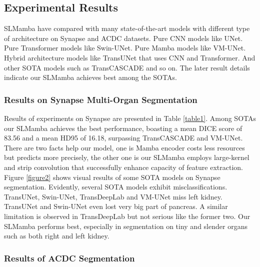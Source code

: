\documentclass[runningheads]{llncs}
\begin{document}
\subsection{Experimental Results}

SLMamba have compared with many state-of-the-art models with different type of architecture on Synapse and ACDC datasets. Pure CNN models like UNet\cite{ronneberger2015unet}. Pure Transformer models like Swin-UNet\cite{cao2021swinunet,cao2023swin}. Pure Mamba models like VM-UNet\cite{ruan2024vmunet}. Hybrid architecture models like TransUNet\cite{chen2021transunet} that uses CNN and Transformer. And other SOTA models such as TransCASCADE\cite{rahman2023transcascade} and so on. The later result details indicate our SLMamba achieves best among the SOTAs.



\subsubsection{Results on Synapse Multi-Organ Segmentation}

Results of experiments on Synapse are presented in Table \textcolor{red}{\ref{table1}}. Among SOTAs our SLMamba achieves the best performance, boasting a mean DICE score of 83.56 and a mean HD95 of 16.18, surpassing TransCASCADE\cite{rahman2023transcascade} and VM-UNet\cite{ruan2024vmunet}. There are two facts help our model, one is Mamba encoder costs less resources but predicts more precisely, the other one is our SLMamba employs large-kernel and strip convolution that successfully enhance capacity of feature extraction. Figure \textcolor{red}{\ref{figure2}} shows visual results of some SOTA models on Synapse segmentation. Evidently, several SOTA models exhibit misclassifications. TransUNet\cite{chen2021transunet}, Swin-UNet\cite{cao2021swinunet}, TransDeepLab\cite{azad2022transdeeplab} and VM-UNet\cite{ruan2024vmunet} miss left kidney. TransUNet\cite{chen2021transunet} and Swin-UNet\cite{cao2021swinunet} even lost very big part of pancreas. A similar limitation is observed in TransDeepLab\cite{azad2022transdeeplab} but not serious like the former two. Our SLMamba performs best, especially in segmentation on tiny and slender organs such as both right and left kidney.




\subsubsection{Results of ACDC Segmentation}
\end{document}
